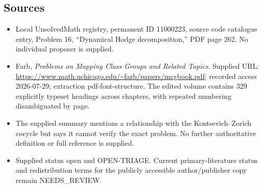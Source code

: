 \documentclass[11pt]{article}
\begin{document}
\subsection{Sources}
\begin{itemize}
\item Local UnsolvedMath registry, permanent ID 11000223, source code catalogue entry, Problem 16, ``Dynamical Hodge decomposition,'' PDF page 262. No individual proposer is supplied.
\item Farb, \emph{Problems on Mapping Class Groups and Related Topics}. Supplied URL: \url{https://www.math.uchicago.edu/~farb/papers/mcgbook.pdf}; recorded access 2026-07-29; extraction pdf-font-structure. The edited volume contains 329 explicitly typeset headings across chapters, with repeated numbering disambiguated by page.
\item The supplied summary mentions a relationship with the Kontsevich--Zorich cocycle but says it cannot verify the exact problem. No further authoritative definition or full reference is supplied.
\item Supplied status open and OPEN-TRIAGE. Current primary-literature status and redistribution terms for the publicly accessible author/publisher copy remain NEEDS\_REVIEW.
\end{itemize}
\end{document}
